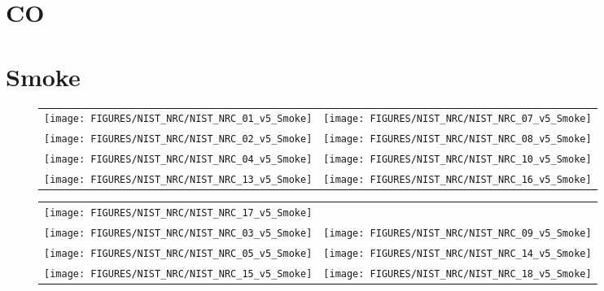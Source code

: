 \clearpage



\section{CO}



\clearpage


\section{Smoke}

\begin{figure}[h]
\begin{tabular*}{\textwidth}{l@{\extracolsep{\fill}}r}
\texttt{[image: FIGURES/NIST\_NRC/NIST\_NRC\_01\_v5\_Smoke]} &
\texttt{[image: FIGURES/NIST\_NRC/NIST\_NRC\_07\_v5\_Smoke]} \\
\texttt{[image: FIGURES/NIST\_NRC/NIST\_NRC\_02\_v5\_Smoke]} &
\texttt{[image: FIGURES/NIST\_NRC/NIST\_NRC\_08\_v5\_Smoke]} \\
\texttt{[image: FIGURES/NIST\_NRC/NIST\_NRC\_04\_v5\_Smoke]} &
\texttt{[image: FIGURES/NIST\_NRC/NIST\_NRC\_10\_v5\_Smoke]} \\
\texttt{[image: FIGURES/NIST\_NRC/NIST\_NRC\_13\_v5\_Smoke]} &
\texttt{[image: FIGURES/NIST\_NRC/NIST\_NRC\_16\_v5\_Smoke]}
\end{tabular*}
\end{figure}

\begin{figure}[p]
\begin{tabular*}{\textwidth}{l@{\extracolsep{\fill}}r}
\texttt{[image: FIGURES/NIST\_NRC/NIST\_NRC\_17\_v5\_Smoke]} &
 \\
\texttt{[image: FIGURES/NIST\_NRC/NIST\_NRC\_03\_v5\_Smoke]} &
\texttt{[image: FIGURES/NIST\_NRC/NIST\_NRC\_09\_v5\_Smoke]} \\
\texttt{[image: FIGURES/NIST\_NRC/NIST\_NRC\_05\_v5\_Smoke]} &
\texttt{[image: FIGURES/NIST\_NRC/NIST\_NRC\_14\_v5\_Smoke]} \\
\texttt{[image: FIGURES/NIST\_NRC/NIST\_NRC\_15\_v5\_Smoke]} &
\texttt{[image: FIGURES/NIST\_NRC/NIST\_NRC\_18\_v5\_Smoke]}
\end{tabular*}
\end{figure}

